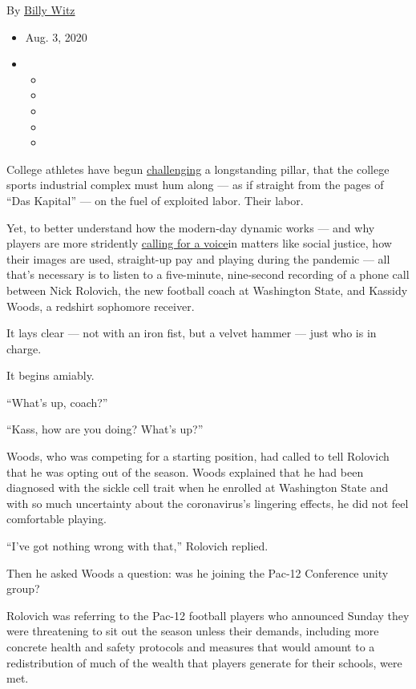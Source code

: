 By \href{https://www.nytimes.com/by/billy-witz}{Billy Witz}

\begin{itemize}
\item
  Aug. 3, 2020
\item
  \begin{itemize}
  \item
  \item
  \item
  \item
  \item
  \end{itemize}
\end{itemize}

College athletes have begun
\href{https://www.nytimes.com/2020/06/12/sports/ncaafootball/george-floyd-protests-college-sports.html}{challenging}
a longstanding pillar, that the college sports industrial complex must
hum along --- as if straight from the pages of ``Das Kapital'' --- on
the fuel of exploited labor. Their labor.

Yet, to better understand how the modern-day dynamic works --- and why
players are more stridently
\href{https://www.nytimes.com/2020/08/02/sports/ncaafootball/coronavirus-college-football-pac-12.html}{calling
for a voice}in matters like social justice, how their images are used,
straight-up pay and playing during the pandemic --- all that's necessary
is to listen to a five-minute, nine-second recording of a phone call
between Nick Rolovich, the new football coach at Washington State, and
Kassidy Woods, a redshirt sophomore receiver.

It lays clear --- not with an iron fist, but a velvet hammer --- just
who is in charge.

It begins amiably.

``What's up, coach?''

``Kass, how are you doing? What's up?''

Woods, who was competing for a starting position, had called to tell
Rolovich that he was opting out of the season. Woods explained that he
had been diagnosed with the sickle cell trait when he enrolled at
Washington State and with so much uncertainty about the coronavirus's
lingering effects, he did not feel comfortable playing.

``I've got nothing wrong with that,'' Rolovich replied.

Then he asked Woods a question: was he joining the Pac-12 Conference
unity group?

Rolovich was referring to the Pac-12 football players who announced
Sunday they were threatening to sit out the season unless their demands,
including more concrete health and safety protocols and measures that
would amount to a redistribution of much of the wealth that players
generate for their schools, were met.

